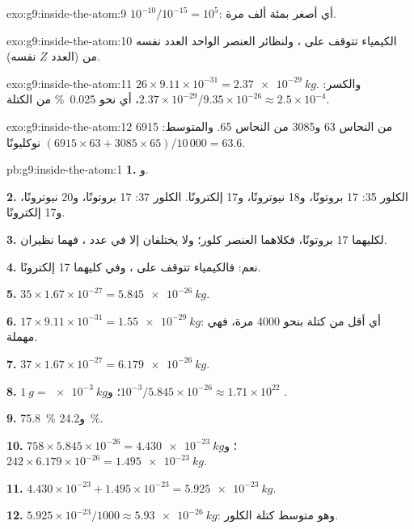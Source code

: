 \begin{solution}{exo:g9:inside-the-atom:9}
$10^{-10} / 10^{-15} = 10^{5}$: أي أصغر بمئة ألف مرة.
\end{solution}

\begin{solution}{exo:g9:inside-the-atom:10}
الكيمياء تتوقف على ، ولنظائر العنصر الواحد العدد نفسه من
 (العدد $Z$ نفسه).
\end{solution}

\begin{solution}{exo:g9:inside-the-atom:11}
$26 \times 9.11 \times 10^{-31} = \qty{2.37e-29}{kg}$. والكسر:
$2.37 \times 10^{-29} / 9.35 \times 10^{-26} \approx 2.5 \times
10^{-4}$، أي نحو \qty{0.025}{\percent} من الكتلة.
\end{solution}

\begin{solution}{exo:g9:inside-the-atom:12}
6915  من النحاس 63 و3085  من النحاس 65. والمتوسط:
$(6915 \times 63 + 3085 \times 65)/10\,000 = 63.6$ نوكليونًا.
\end{solution}

\begin{solution}{pb:g9:inside-the-atom:1}
\textbf{1.}  و.

\textbf{2.} الكلور 35: 17 بروتونًا، و18 نيوترونًا، و17 إلكترونًا.
الكلور 37: 17 بروتونًا، و20 نيوترونًا، و17 إلكترونًا.

\textbf{3.} لكليهما 17 بروتونًا، فكلاهما العنصر كلور؛ ولا يختلفان إلا في عدد
، فهما نظيران.

\textbf{4.} نعم: فالكيمياء تتوقف على ، وفي كليهما 17 إلكترونًا.

\textbf{5.} $35 \times 1.67 \times 10^{-27} = \qty{5.845e-26}{kg}$.

\textbf{6.} $17 \times 9.11 \times 10^{-31} = \qty{1.55e-29}{kg}$:
أي أقل من كتلة  بنحو 4000 مرة، فهي مهملة.

\textbf{7.} $37 \times 1.67 \times 10^{-27} = \qty{6.179e-26}{kg}$.

\textbf{8.} $\qty{1}{g} = \qty{e-3}{kg}$؛ و$10^{-3} / 5.845 \times
10^{-26} \approx 1.71 \times 10^{22}$ .

\textbf{9.} \qty{75.8}{\percent} و\qty{24.2}{\percent}.

\textbf{10.} $758 \times 5.845 \times 10^{-26} = \qty{4.430e-23}{kg}$؛
و$242 \times 6.179 \times 10^{-26} = \qty{1.495e-23}{kg}$.

\textbf{11.} $4.430 \times 10^{-23} + 1.495 \times 10^{-23} =
\qty{5.925e-23}{kg}$.

\textbf{12.} $5.925 \times 10^{-23} / 1000 \approx
\qty{5.93e-26}{kg}$: وهو متوسط كتلة  الكلور.
\end{solution}

